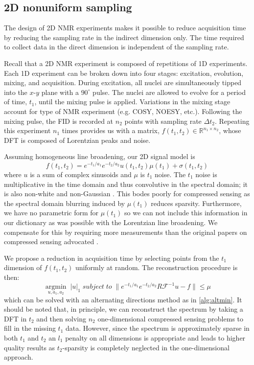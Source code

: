 \documentclass[11pt]{article}
\newcommand{\R}{\mathbb{R}}
\begin{document}
\subsection{2D nonuniform sampling}

The design of 2D NMR experiments makes it possible to reduce acquisition time by reducing the sampling rate in the indirect dimension only. The time required to collect data in the direct  dimension is independent of the sampling rate.

Recall that a 2D NMR experiment is composed of repetitions of 1D experiments. Each 1D experiment can be broken down into four stages: excitation, evolution, mixing, and acquisition. During excitation, all nuclei are simultaneously tipped into the $x$-$y$ plane with a $90^\circ$ pulse. The nuclei are allowed to evolve for a period of time, $t_1$, until the mixing pulse is applied. Variations in the mixing stage account for type of NMR experiment (e.g. COSY, NOESY, etc.). Following the mixing pulse, the FID is recorded at $n_2$ points with sampling rate $\Delta t_2$. Repeating this experiment $n_1$ times provides us with a matrix, $f(t_1,t_2) \in \R^{n_1 \times n_2}$, whose DFT is composed of Lorentzian peaks and noise.

Assuming homogeneous line broadening, our 2D signal model is
\begin{equation}\label{eq:2Dmodel}
f(t_1,t_2) = e^{-t_1/a_1}e^{-t_2/a_2}u(t_1,t_2)\mu(t_1) + \sigma(t_1,t_2)
\end{equation}
where $u$ is a sum of complex sinusoids and $\mu$ is $t_1$ noise. The $t_1$ noise is multiplicative in the time domain and thus convolutive in the spectral domain; it is also non-white and non-Gaussian \cite{Granwehr2007}. This bodes poorly for compressed sensing as the spectral domain blurring induced by $\mu(t_1)$ reduces sparsity. Furthermore, we have no parametric form for $\mu(t_1)$ so we can not include this information in our dictionary as was possible with the Lorentzian line broadening. We compensate for this by requiring more measurements than the original papers on compressed sensing advocated \cite{Candes2005}.

We propose a reduction in acquisition time by selecting points from the $t_1$ dimension of $f(t_1,t_2)$ uniformly at random. The reconstruction procedure is then:
\begin{equation}\label{eq:lorentzcs2D}
\underset{u,a_1, a_2}{\operatorname{argmin}} \; |u|_1 \; subject\;to \; \| e^{-t_1/a_1}e^{-t_2/a_2}R\mathcal{F}^{-1}u - f \| \leq \mu
\end{equation}
which can be solved with an alternating directions method as in \cref{alg:altmin}. It should be noted that, in principle, we can reconstruct the spectrum by taking a DFT in $t_2$ and then solving $n_2$ one-dimensional compressed sensing problems to fill in the missing $t_1$ data. However, since the spectrum is approximately sparse in both $t_1$ and $t_2$ an $l_1$ penalty on all dimensions is appropriate and leads to higher quality results as $t_2$-sparsity is completely neglected in the one-dimensional approach.
\end{document}

